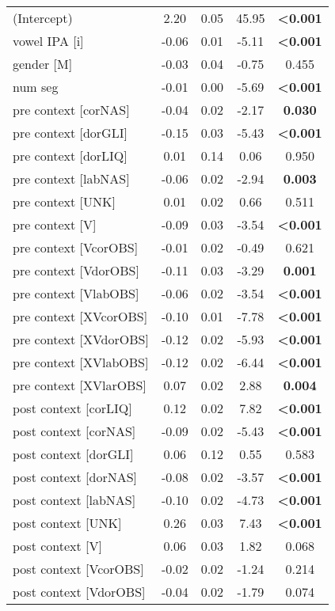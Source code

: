 \documentclass[output=paper,colorlinks,citecolor=brown]{langscibook}
\begin{document}
{\begin{longtable}{l S[table-format=-1.2] S[table-format=1.2] S[table-format=-1.2] S[table-format=<1.3]}
(Intercept) & 2.20 & 0.05 & 45.95 & \bfseries <0.001\\
vowel IPA [i] & -0.06 & 0.01 & -5.11 & \bfseries <0.001\\
gender [M] & -0.03 & 0.04 & -0.75 & 0.455\\
num seg & -0.01 & 0.00 & -5.69 & \bfseries <0.001\\
pre context [corNAS] & -0.04 & 0.02 & -2.17 & \bfseries 0.030\\
pre context [dorGLI] & -0.15 & 0.03 & -5.43 & \bfseries <0.001\\
pre context [dorLIQ] & 0.01 & 0.14 & 0.06 & 0.950\\
pre context [labNAS] & -0.06 & 0.02 & -2.94 & \bfseries 0.003\\
pre context [UNK] & 0.01 & 0.02 & 0.66 & 0.511\\
pre context [V] & -0.09 & 0.03 & -3.54 & \bfseries <0.001\\
pre context [VcorOBS] & -0.01 & 0.02 & -0.49 & 0.621\\
pre context [VdorOBS] & -0.11 & 0.03 & -3.29 & \bfseries 0.001\\
pre context [VlabOBS] & -0.06 & 0.02 & -3.54 & \bfseries <0.001\\
pre context [XVcorOBS] & -0.10 & 0.01 & -7.78 & \bfseries <0.001\\
pre context [XVdorOBS] & -0.12 & 0.02 & -5.93 & \bfseries <0.001\\
pre context [XVlabOBS] & -0.12 & 0.02 & -6.44 & \bfseries <0.001\\
pre context [XVlarOBS] & 0.07 & 0.02 & 2.88 & \bfseries 0.004\\
post context [corLIQ] & 0.12 & 0.02 & 7.82 & \bfseries <0.001\\
post context [corNAS] & -0.09 & 0.02 & -5.43 & \bfseries <0.001\\
post context [dorGLI] & 0.06 & 0.12 & 0.55 & 0.583\\
post context [dorNAS] & -0.08 & 0.02 & -3.57 & \bfseries <0.001\\
post context [labNAS] & -0.10 & 0.02 & -4.73 & \bfseries <0.001\\
post context [UNK] & 0.26 & 0.03 & 7.43 & \bfseries <0.001\\
post context [V] & 0.06 & 0.03 & 1.82 & 0.068\\
post context [VcorOBS] & -0.02 & 0.02 & -1.24 & 0.214\\
post context [VdorOBS] & -0.04 & 0.02 & -1.79 & 0.074\\

\end{longtable}}
\end{document}
